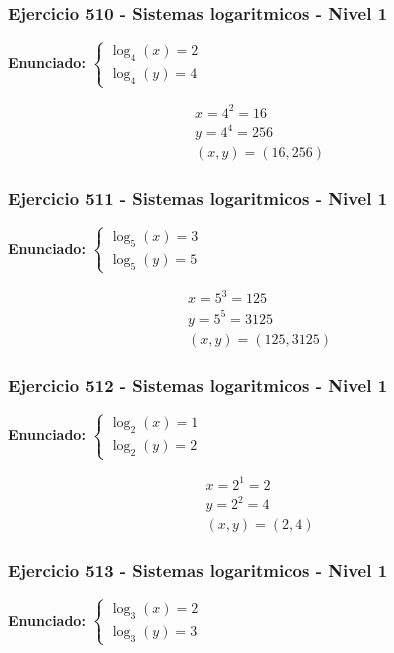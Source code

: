 \documentclass[12pt,a4paper]{article}
\begin{document}
\subsubsection*{Ejercicio 510 - Sistemas logaritmicos - Nivel 1}
\textbf{Enunciado:} \(\begin{cases} \log_{4}\left(x\right)=2\\ \log_{4}\left(y\right)=4\end{cases}\)

\[
\begin{aligned}
x=4^{2}=16\\
y=4^{4}=256\\
\boxed{(x,y)=(16,256)}
\end{aligned}
\]


\subsubsection*{Ejercicio 511 - Sistemas logaritmicos - Nivel 1}
\textbf{Enunciado:} \(\begin{cases} \log_{5}\left(x\right)=3\\ \log_{5}\left(y\right)=5\end{cases}\)

\[
\begin{aligned}
x=5^{3}=125\\
y=5^{5}=3125\\
\boxed{(x,y)=(125,3125)}
\end{aligned}
\]


\subsubsection*{Ejercicio 512 - Sistemas logaritmicos - Nivel 1}
\textbf{Enunciado:} \(\begin{cases} \log_{2}\left(x\right)=1\\ \log_{2}\left(y\right)=2\end{cases}\)

\[
\begin{aligned}
x=2^{1}=2\\
y=2^{2}=4\\
\boxed{(x,y)=(2,4)}
\end{aligned}
\]


\subsubsection*{Ejercicio 513 - Sistemas logaritmicos - Nivel 1}
\textbf{Enunciado:} \(\begin{cases} \log_{3}\left(x\right)=2\\ \log_{3}\left(y\right)=3\end{cases}\)
\end{document}

